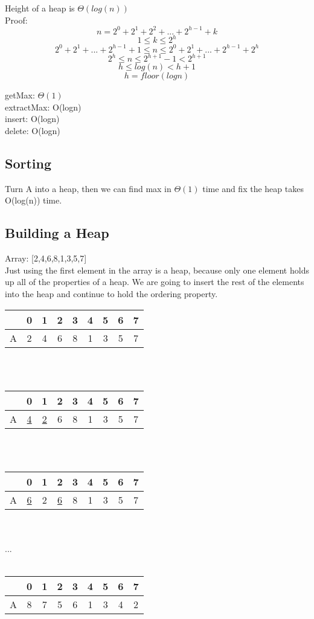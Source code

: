 \documentclass[12pt]{article}
\begin{document}
	Height of a heap is $\Theta(log(n))$\\
	Proof:
	$$n = 2^0 + 2^1 + 2^2 + ... + 2^{h-1} + k$$
	$$1 \leq k \leq 2^h$$
	$$2^0 + 2^1 + ... + 2^{h-1} + 1 \leq n \leq 2^0 + 2^1 + ... + 2^{h-1} + 2^h$$
	$$2^h \leq n \leq 2^{h+1} - 1 < 2^{h+1}$$
	$$h \leq log(n) < h + 1$$
	$$h = floor(logn)$$
	
	getMax: $\Theta(1)$ \\
	extractMax: O(logn)\\
	insert: O(logn)\\
	delete: O(logn) \\
	
	\subsection*{Sorting}
	Turn A into a heap, then we can find max in $\Theta(1)$ time and fix the heap takes O(log(n)) time.\\
	
	\subsection*{Building a Heap}
	Array: [2,4,6,8,1,3,5,7]\\
	Just using the first element in the array is a heap, because only one element holds up all of the properties of a heap. We are going to insert the rest of the elements into the heap and continue to hold the ordering property.\\
	
	\begin{tabular}{c | c | c | c | c | c | c | c | c }
		& 0 & 1 & 2 & 3 & 4 & 5 & 6 & 7  \\ \hline
		A & 2 & 4 & 6 & 8 & 1 & 3 & 5 & 7  \\
	\end{tabular}\\\\
	\begin{tabular}{c | c | c | c | c | c | c | c | c }
		& 0 & 1 & 2 & 3 & 4 & 5 & 6 & 7  \\ \hline
		A & \underline{4} & \underline{2} & 6 & 8 & 1 & 3 & 5 & 7  \\
	\end{tabular}\\\\
	\begin{tabular}{c | c | c | c | c | c | c | c | c }
		& 0 & 1 & 2 & 3 & 4 & 5 & 6 & 7  \\ \hline
		A & \underline{6} & 2 & \underline{6} & 8 & 1 & 3 & 5 & 7  \\
	\end{tabular}\\\\
	...\\\\
	\begin{tabular}{c | c | c | c | c | c | c | c | c }
		& 0 & 1 & 2 & 3 & 4 & 5 & 6 & 7 \\ \hline
		A & 8 & 7 & 5 & 6 & 1 & 3 & 4 & 2 \\
	\end{tabular}\\\\
	
\end{document}

